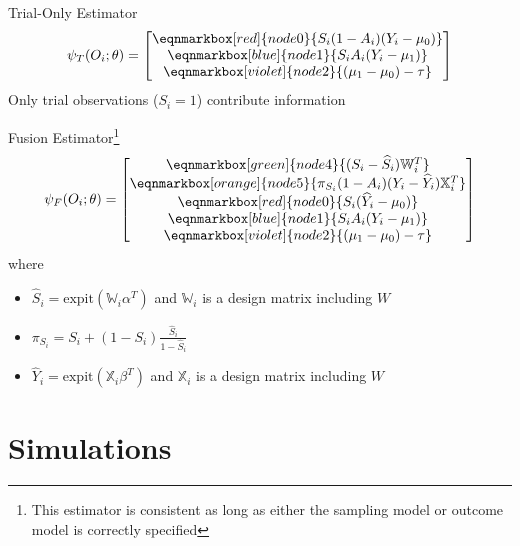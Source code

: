 \documentclass{beamer}
\begin{document}
\begin{frame}{Trial-Only Estimator}
	\begin{equation*}
		\psi_{T}(O_i; \theta) = 
		\begin{bmatrix}
			\eqnmarkbox[red]{node0}{S_i (1 - A_i) (Y_i - \mu_0)} \\ 
			\eqnmarkbox[blue]{node1}{S_i A_i (Y_i - \mu_1)} \\ 
			\eqnmarkbox[violet]{node2}{(\mu_1 - \mu_0) - \tau} \\
		\end{bmatrix}
	\end{equation*}
	Only trial observations ($S_i = 1$) contribute information
\end{frame}

\begin{frame}{Fusion Estimator\footnote[frame]{This estimator is consistent as long as either the sampling model or outcome model is correctly specified}}
	\begin{equation*}
		\psi_{F}(O_i; \theta) = 
		\begin{bmatrix}
			\eqnmarkbox[green]{node4}{(S_i - \widehat{S}_i ) \mathbb{W}_i^T} \\
			\eqnmarkbox[orange]{node5}{\pi_{S_i} (1-A_i) (Y_i - \widehat{Y}_i ) \mathbb{X}_i^T} \\
			\eqnmarkbox[red]{node0}{S_i (\widehat{Y}_i - \mu_0)} \\ 
			\eqnmarkbox[blue]{node1}{S_i A_i (Y_i - \mu_1)} \\ 
			\eqnmarkbox[violet]{node2}{(\mu_1 - \mu_0) - \tau} \\
		\end{bmatrix}
	\end{equation*}
	where 
	\begin{itemize}
		\item $\widehat{S}_i = \text{expit}(\mathbb{W}_i \alpha^T)$ and $\mathbb{W}_i$ is a design matrix including $W$
		\item $\pi_{S_i} = S_i + (1-S_i)\frac{\widehat{S}_i}{1-\widehat{S}_i}$
		\item $\widehat{Y}_i = \text{expit}(\mathbb{X}_i \beta^T)$ and $\mathbb{X}_i$ is a design matrix including $W$
	\end{itemize}
\end{frame}

\section{Simulations}
\end{document}
